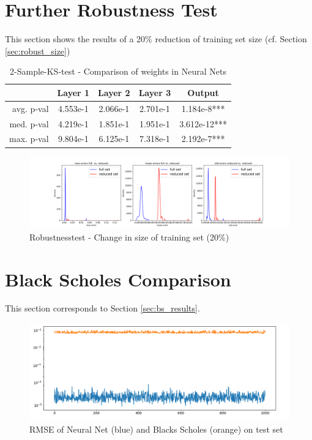 \documentclass{article}
\begin{document}
\section{Further Robustness Test}\label{app:robust_size}
This section shows the results of a 20\% reduction of training set size (cf. Section \ref{sec:robust_size})
\begin{table}[!ht]
    \centering
    \begin{tabular}{|r|c|c|c|c|}\hline
     & Layer 1     &  Layer 2     & Layer 3 &    Output\\\hline
    avg. p-val & 4.553e-1&  2.066e-1& 2.701e-1& 1.184e-8***\\\hline
    med. p-val & 4.219e-1 & 1.851e-1 & 1.951e-1& 3.612e-12***\\\hline
    max. p-val & 9.804e-1 & 6.125e-1 &7.318e-1&2.192e-7***\\\hline
    \end{tabular}\vspace{0.1cm}
    \caption{2-Sample-KS-test - Comparison of weights in Neural Nets}
    \label{tab:weights_size_20p}
\end{table}
\begin{figure}[!ht]
    \centering
    \includegraphics[width=\textwidth]{RobustnessSize20p.png}
    \caption{Robustnesstest - Change in size of training set (20\%)}
    \label{fig:trainset_sensitivity_20p}
\end{figure}
\section{Black Scholes Comparison}\label{app:bs_rmse}
This section corresponds to Section \ref{sec:bs_results}.
\begin{figure}[!ht]
    \centering
    \includegraphics[width=\textwidth]{rmse_modelvsbls.png}
    \caption{RMSE of Neural Net (blue) and Blacks Scholes (orange) on test set }
    \label{fig:rmse_bs_net}
\end{figure}
\end{document}
